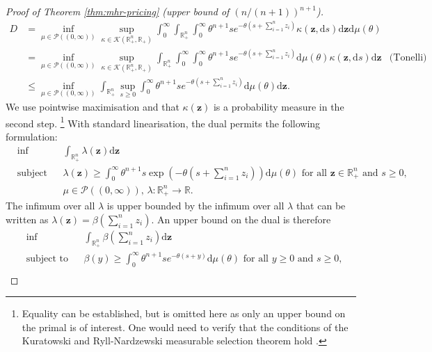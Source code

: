 \documentclass[11pt]{article}
\newcommand{\dd}{\mathrm{d}}
\begin{document}
\begin{proof}[Proof of Theorem \ref{thm:mhr-pricing} (upper bound of $(n/(n+1))^{n+1}$)]
    \begin{align*}
        D&=\inf_{\mu\in\mathcal{P}((0,\infty))}\sup_{\kappa\in\mathcal{K}(\mathbb{R}^n_+,\mathbb{R}_+)}\int_0^\infty 
        \int_{\mathbb{R}^n_+}\int_0^\infty\theta^{n+1}se^{-\theta\left(s+\sum_{i=1}^nz_i\right)} \kappa(\boldsymbol{z},\dd s)\dd \boldsymbol{z}
        \dd \mu(\theta)\\
        &=\inf_{\mu\in\mathcal{P}((0,\infty))} \sup_{\kappa\in\mathcal{K}(\mathbb{R}^n_+,\mathbb{R}_+)}\int_{\mathbb{R}^n_+}\int_0^\infty\int_0^\infty\theta^{n+1}se^{-\theta\left(s+\sum_{i=1}^nz_i\right)}\dd \mu(\theta) \kappa(\boldsymbol{z},\dd s)\dd \boldsymbol{z}&\text{(Tonelli)}\\
        &\le\inf_{\mu\in\mathcal{P}((0,\infty))} \int_{\mathbb{R}^n_+}\sup_{s\ge 0}\int_0^\infty\theta^{n+1}se^{-\theta\left(s+\sum_{i=1}^nz_i\right)}\dd \mu(\theta)\dd \boldsymbol{z}.
    \end{align*}
    We use pointwise maximisation and that $\kappa(\boldsymbol{z})$ is a probability measure in the second step.
    \footnote{Equality can be established, but is omitted here as only an upper bound on the primal is of interest.
    One would need to verify that the conditions of the Kuratowski and Ryll-Nardzewski measurable selection theorem hold
\cite[Theorem 18.13]{aliprantis2006infinite}.}
    With standard linearisation, the dual permits the following formulation:
    \begin{align*}
        &\inf && \int_{\mathbb{R}_+^n}\lambda(\boldsymbol{z})\dd \boldsymbol{z}\\
        &\text{subject to} &&
        \lambda(\boldsymbol{z})\ge\int_0^\infty \theta^{n+1}s\exp\left(-\theta\left(s+\sum_{i=1}^nz_i\right)\right)\dd \mu(\theta)\text{ for all }\boldsymbol{z}\in\mathbb{R}_+^n\text{ and }s\ge 0,
        \\
        &&& \mu\in\mathcal{P}((0,\infty))\text{, } \lambda:\mathbb{R}_+^n\to\mathbb{R}.
    \end{align*} 
    The infimum over all $\lambda$ is upper bounded by the infimum over all $\lambda$ that can be written as $\lambda(\boldsymbol{z})=\beta\left(\sum_{i=1}^nz_i\right)$. An upper bound on the dual is therefore
    \begin{align*}
        &\inf && \int_{\mathbb{R}_+^n}\beta\left(\sum_{i=1}^nz_i\right)\dd \boldsymbol{z}\\
        &\text{subject to} &&
        \beta(y)\ge\int_0^\infty \theta^{n+1}se^{-\theta(s+y)} \dd \mu(\theta)\text{ for all }y\ge 0\text{ and }s\ge 0,
        \\

\end{align*}
\end{proof}
\end{document}

